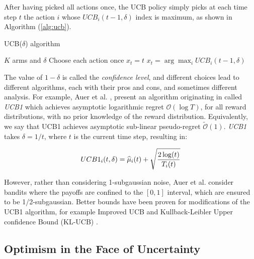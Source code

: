 After having picked all actions once, the \gls{UCB} policy simply picks at each time step $t$ the action $i$ whose $UCB_i(t-1,\delta)$ index is maximum, as shown in Algorithm (\ref{alg:ucb}).

\begin{algorithm}[t]
	\caption{\gls{UCB}($\delta$) algorithm}
	\label{alg:ucb}
	\begin{algorithmic}[1]
	 $K$ arms and $\delta$
	\State Choose each action once
			\State $x_{t} = t$
		\Else
			\State $x_t = \arg\max_i UCB_i(t-1, \delta)$
		\EndIf
	\EndFor
	\end{algorithmic}
\end{algorithm}


The value of $1-\delta$ is called the \emph{confidence level}, and different choices lead to different algorithms, each with their pros and cons, and sometimes different analysis. For example, Auer et al. \cite{auer2002finite}, present an algorithm originating in \cite{agrawal1995continuum} called \emph{UCB1} which achieves asymptotic logarithmic regret $\mathcal{O}(\log{T})$, for all reward distributions, with no prior knowledge of the reward distribution. Equivalently, we say that UCB1 achieves asymptotic sub-linear pseudo-regret $\widetilde{\mathcal{O}}(1)$. \emph{UCB1} takes $\delta=1/t$, where $t$ is the current time step, resulting in:

\begin{align}
UCB1_i(t, \delta) = \widehat{\mu}_i(t) + \sqrt{\frac{2\log(t)}{T_i(t)}}
\end{align}

However, rather than considering 1-subgaussian noise, Auer et al. \cite{auer2002finite} consider bandits where the payoffs are confined to the $[0,1]$ interval, which are ensured to be 1/2-subgaussian. Better bounds have been proven for modifications of the UCB1 algorithm, for example Improved UCB \cite{auer2010ucb} and Kullback-Leibler Upper confidence Bound (KL-UCB) \cite{garivier2011kl}.

\subsection{Optimism in the Face of Uncertainty}


